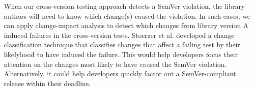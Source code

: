 When our cross-version testing approach detects a SemVer violation,
the library authors will need to know which change(s) caused the
violation. In such cases, we can apply change-impact analysis
\cite{Stoerzer} to detect which changes from library version A induced
failures in the cross-version tests. Stoerzer et al. \cite{Stoerzer}
developed a change classification technique that classifies changes
that affect a failing test by their likelyhood to have induced the
failure. This would help developers focus their attention on the
changes most likely to have caused the SemVer
violation. Alternatively, it could help developers quickly factor out
a SemVer-compliant release within their deadline.


